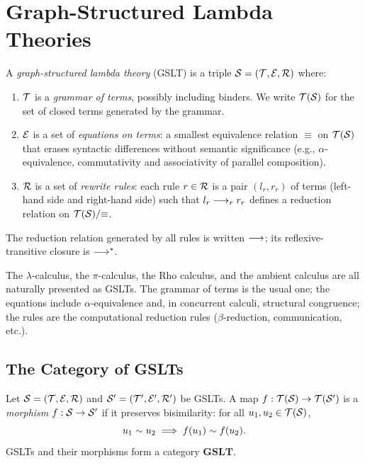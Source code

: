 \chapter{Graph-Structured Lambda Theories}
\label{sec:gslt}

\begin{definition}
A \emph{graph-structured lambda theory} (GSLT) is a triple
$\mathcal{S} = (\mathcal{T}, \mathcal{E}, \mathcal{R})$ where:
\begin{enumerate}[label=(\roman*)]
  \item $\mathcal{T}$ is a \emph{grammar of terms}, possibly including binders.
        We write $\mathcal{T}(\mathcal{S})$ for the set of closed terms generated by
        the grammar.
  \item $\mathcal{E}$ is a set of \emph{equations on terms}: a smallest equivalence
        relation $\equiv$ on $\mathcal{T}(\mathcal{S})$ that erases syntactic differences
        without semantic significance (e.g., $\alpha$-equivalence, commutativity
        and associativity of parallel composition).
  \item $\mathcal{R}$ is a set of \emph{rewrite rules}: each rule $r \in \mathcal{R}$ is
        a pair $(l_r, r_r)$ of terms (left-hand side and right-hand side) such
        that $l_r \longrightarrow_r r_r$ defines a reduction relation on
        $\mathcal{T}(\mathcal{S})/{\equiv}$.
\end{enumerate}
The reduction relation generated by all rules is written $\longrightarrow$; its
reflexive-transitive closure is $\longrightarrow^{*}$.
\end{definition}

\begin{example}
The $\lambda$-calculus, the $\pi$-calculus, the Rho calculus, and the
ambient calculus are all naturally presented as GSLTs.  The grammar of terms
is the usual one; the equations include $\alpha$-equivalence and, in
concurrent calculi, structural congruence; the rules are the computational
reduction rules ($\beta$-reduction, communication, etc.).
\end{example}

\section{The Category of GSLTs}

\begin{definition}
Let $\mathcal{S} = (\mathcal{T}, \mathcal{E}, \mathcal{R})$ and $\mathcal{S}' = (\mathcal{T}', \mathcal{E}', \mathcal{R}')$
be GSLTs.  A map $f : \mathcal{T}(\mathcal{S}) \to \mathcal{T}(\mathcal{S}')$ is a
\emph{morphism} $f : \mathcal{S} \to \mathcal{S}'$ if it preserves bisimilarity:
for all $u_1, u_2 \in \mathcal{T}(\mathcal{S})$,
\[
  u_1 \sim u_2 \;\Longrightarrow\; f(u_1) \sim f(u_2).
\]
GSLTs and their morphisms form a category $\mathbf{GSLT}$.
\end{definition}

